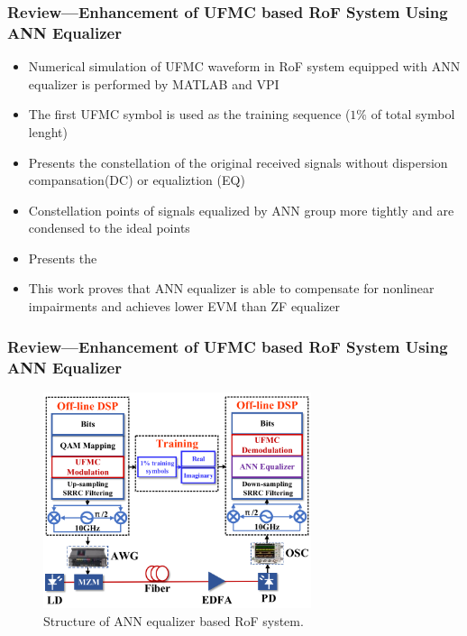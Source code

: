 \documentclass[t]{beamer}
\begin{document}
\begin{frame}
    \frametitle{Review---Enhancement of UFMC based RoF System Using ANN Equalizer \cite{Liu2019}}
    \begin{itemize}
        \item Numerical simulation of UFMC waveform in RoF system equipped with ANN equalizer is performed by MATLAB and VPI
        \item The first UFMC symbol is used as the training sequence (\(1\%\) of total symbol lenght)
        \item Presents the constellation of the original received signals without dispersion compansation(DC) or equaliztion (EQ)
        \item Constellation points of signals equalized by ANN group more tightly and are condensed to the ideal points
        \item Presents the 
        \item This work proves that ANN equalizer is able to compensate for nonlinear impairments and achieves lower EVM than ZF equalizer
    \end{itemize}
\end{frame}

\begin{frame}
    \frametitle{Review---Enhancement of UFMC based RoF System Using ANN Equalizer \cite{Liu2019}}
    \begin{figure}
        \includegraphics[width=0.7\textwidth]{ANNEqualizer.PNG}
        \caption{Structure of ANN equalizer based RoF system.}
    \end{figure}
\end{frame}
\end{document}

